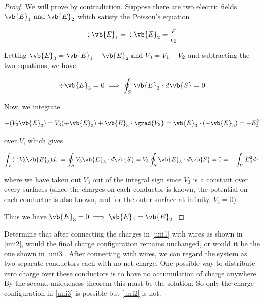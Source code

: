 \documentclass[english,a4paper,12pt]{report}
\begin{document}
\begin{proof}
We will prove by contradiction. Suppose there are two electric fields \(\vb{E} _{1} \text{ and } \vb{E} _{2} \) which satisfy the Poisson's equation

\begin{equation}
    \div{\vb{E} _{1} } = \div{\vb{E} _{2} } = \frac{\rho }{\epsilon_0}
\end{equation}

Letting \(\vb{E} _{3} = \vb{E} _{1} - \vb{E} _{2} \text{ and } V_3 = V_1 - V_2 \) and subtracting the two equations, we have

\begin{equation}
    \div{\vb{E} _{3} } = 0 \implies  \oint_{S} \vb{E} _{3} \cdot d\vb{S}  = 0 	\label{divE3} 
\end{equation}

Now, we integrate

\begin{equation}
    \div{(V_3\vb{E} _{3} )} = V_3(\div{\vb{E} _{3} }) + \vb{E} _{3} \cdot \grad{V_3} = \vb{E} _{3} \cdot (-\vb{E} _{3} ) = -E_3^2
\end{equation}

over \(V\), which gives

\begin{equation}
    \int _{V} (\div{V_3\vb{E} _{3} } ) d\tau  = \oint _{S} V_3\vb{E} _{3} \cdot d\vb{S} = V_3 \oint_{S} \vb{E} _{3}\cdot d\vb{S} = 0 = -\int _{V} E_3^2 d\tau 
\end{equation}

where we have taken out \(V_3 \) out of the integral sign since \(V_3\) is a constant over every surfaces (since the charges on each conductor is known, the potential on each conductor is also known, and for the outer surface at infinity, \(V_3 = 0\))

Thus we have \(\vb{E} _{3} = 0 \implies \vb{E} _{1} = \vb{E} _{2}  \). 
\end{proof}

{Determine that after connecting the charges in \cref{uni1} with wires as shown in \cref{uni2}, would the final charge configuration remains unchanged, or would it be the one shown in \cref{uni3}.}
{After connecting with wires, we can regard the system as two separate conductors each with no net charge. One possible way to distribute zero charge over these conductors is to have no accumulation of charge anywhere. By the second uniqueness theorem this must be the solution. So only the charge configuration in \cref{uni3} is possible but \cref{uni2} is not. 
} 
\end{document}

